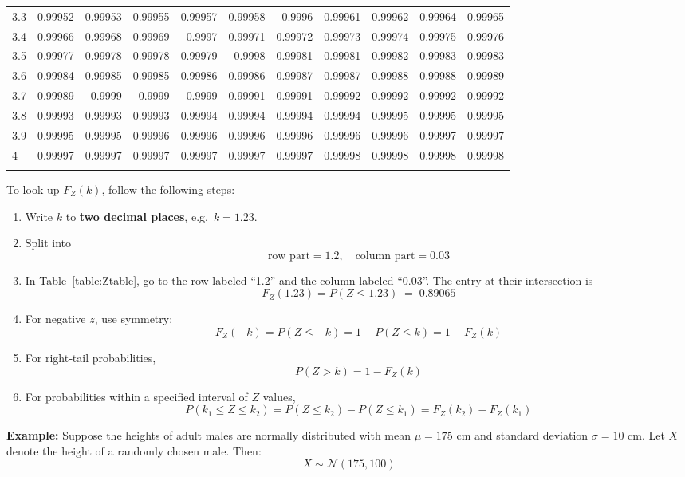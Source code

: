 \documentclass[twoside]{book}
\begin{document}
\begin{table}[!h]
\begin{tabular}{l|*{10}{r}}
3.3 & 0.99952 & 0.99953 & 0.99955 & 0.99957 & 0.99958 & 0.9996  & 0.99961 & 0.99962 & 0.99964 & 0.99965 \\
3.4 & 0.99966 & 0.99968 & 0.99969 & 0.9997  & 0.99971 & 0.99972 & 0.99973 & 0.99974 & 0.99975 & 0.99976 \\
3.5 & 0.99977 & 0.99978 & 0.99978 & 0.99979 & 0.9998  & 0.99981 & 0.99981 & 0.99982 & 0.99983 & 0.99983 \\
3.6 & 0.99984 & 0.99985 & 0.99985 & 0.99986 & 0.99986 & 0.99987 & 0.99987 & 0.99988 & 0.99988 & 0.99989 \\
3.7 & 0.99989 & 0.9999  & 0.9999  & 0.9999  & 0.99991 & 0.99991 & 0.99992 & 0.99992 & 0.99992 & 0.99992 \\
3.8 & 0.99993 & 0.99993 & 0.99993 & 0.99994 & 0.99994 & 0.99994 & 0.99994 & 0.99995 & 0.99995 & 0.99995 \\
3.9 & 0.99995 & 0.99995 & 0.99996 & 0.99996 & 0.99996 & 0.99996 & 0.99996 & 0.99996 & 0.99997 & 0.99997 \\
4   & 0.99997 & 0.99997 & 0.99997 & 0.99997 & 0.99997 & 0.99997 & 0.99998 & 0.99998 & 0.99998 & 0.99998 \\
\addlinespace
\bottomrule
\end{tabular}
\end{table}

To look up \(F_Z(k)\), follow the following steps:

\begin{enumerate}
  \item Write \(k\) to \textbf{two decimal places}, e.g.\ \(k=1.23\).
  \item Split into
    \[
      \text{row part} = 1.2,\quad
      \text{column part} = 0.03
    \]
  \item In Table~\ref{table:Ztable}, go to the row labeled “1.2” and the column
    labeled “0.03”.  The entry at their intersection is
    \[
      F_Z(1.23) = P(Z\le 1.23) \;=\; 0.89065
    \]
  \item For negative \(z\), use symmetry:
    \[
      F_Z(-k) = P(Z\le -k)
      = 1 - P(Z\le k) = 1 - F_Z(k)
    \]
  \item For right‐tail probabilities,
    \[
      P(Z>k) = 1 - F_Z(k)
    \]
  \item For probabilities within a specified interval of $ Z $ values,
  $$P(k_1 \leq Z \leq k_2) = P(Z \leq k_2) - P(Z \leq k_1) = F_Z(k_2) - F_Z(k_1)$$
\end{enumerate}

\textbf{Example:} Suppose the heights of adult males are normally distributed with mean $\mu = 175$ cm and standard deviation $\sigma = 10$ cm. Let $X$ denote the height of a randomly chosen male. Then:
\[
X \sim \mathcal{N}(175, 100)
\]
\end{document}
